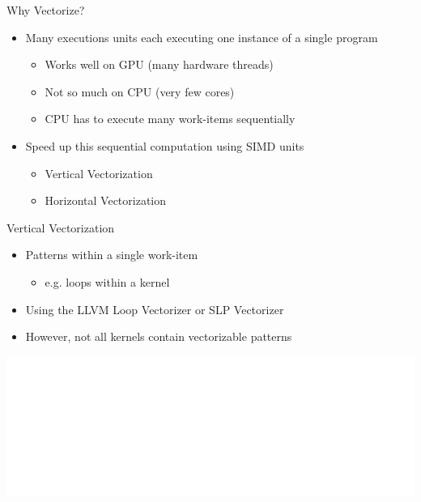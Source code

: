 
\begin{frame}{Why Vectorize?}

\begin{itemize}
    \item Many executions units each executing one instance of a single program 
    \begin{itemize}
        \item Works well on GPU (many hardware threads)
        \item Not so much on CPU (very few cores)
        \item CPU has to execute many work-items sequentially
    \end{itemize}
    \item Speed up this sequential computation using SIMD units
    \begin{itemize}
        \item Vertical Vectorization
        \item Horizontal Vectorization
    \end{itemize}
\end{itemize}

\end{frame}


\begin{frame}{Vertical Vectorization}

\begin{itemize}
    \item Patterns within a single work-item
    \begin{itemize}
        \item e.g. loops within a kernel
    \end{itemize}
    \item Using the LLVM Loop Vectorizer or SLP Vectorizer
    \item However, not all kernels contain vectorizable patterns
\end{itemize}

\vspace{4ex}
\hspace{1em}\includegraphics[scale=0.50]{images/vertical-vectorization.pdf}

\end{frame}

